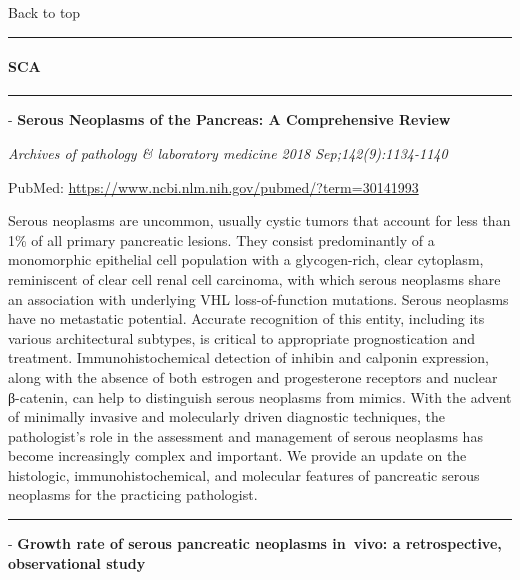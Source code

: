 \documentclass[]{article}
\let\oldparagraph\paragraph
\renewcommand{\paragraph}[1]{\oldparagraph{#1}\mbox{}}
\begin{document}
Back to top

\begin{center}\rule{0.5\linewidth}{\linethickness}\end{center}

\pagebreak

\hypertarget{sca}{%
\paragraph{SCA}\label{sca}}

\begin{center}\rule{0.5\linewidth}{\linethickness}\end{center}

 - \textbf{Serous Neoplasms of the Pancreas: A Comprehensive Review}

\emph{Archives of pathology \& laboratory medicine 2018
Sep;142(9):1134-1140}

PubMed: \url{https://www.ncbi.nlm.nih.gov/pubmed/?term=30141993}

Serous neoplasms are uncommon, usually cystic tumors that account for
less than 1\% of all primary pancreatic lesions. They consist
predominantly of a monomorphic epithelial cell population with a
glycogen-rich, clear cytoplasm, reminiscent of clear cell renal cell
carcinoma, with which serous neoplasms share an association with
underlying VHL loss-of-function mutations. Serous neoplasms have no
metastatic potential. Accurate recognition of this entity, including its
various architectural subtypes, is critical to appropriate
prognostication and treatment. Immunohistochemical detection of inhibin
and calponin expression, along with the absence of both estrogen and
progesterone receptors and nuclear β-catenin, can help to distinguish
serous neoplasms from mimics. With the advent of minimally invasive and
molecularly driven diagnostic techniques, the pathologist's role in the
assessment and management of serous neoplasms has become increasingly
complex and important. We provide an update on the histologic,
immunohistochemical, and molecular features of pancreatic serous
neoplasms for the practicing pathologist.

{}

{}

\begin{center}\rule{0.5\linewidth}{\linethickness}\end{center}

 - \textbf{Growth rate of serous pancreatic neoplasms in~vivo: a
retrospective, observational study}
\end{document}
